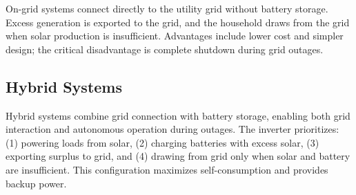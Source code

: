 On-grid systems connect directly to the utility grid without battery storage. Excess generation is exported to the grid, and the household draws from the grid when solar production is insufficient. Advantages include lower cost and simpler design; the critical disadvantage is complete shutdown during grid outages.

\subsection{Hybrid Systems}

Hybrid systems combine grid connection with battery storage, enabling both grid interaction and autonomous operation during outages. The inverter prioritizes: (1) powering loads from solar, (2) charging batteries with excess solar, (3) exporting surplus to grid, and (4) drawing from grid only when solar and battery are insufficient. This configuration maximizes self-consumption and provides backup power.
